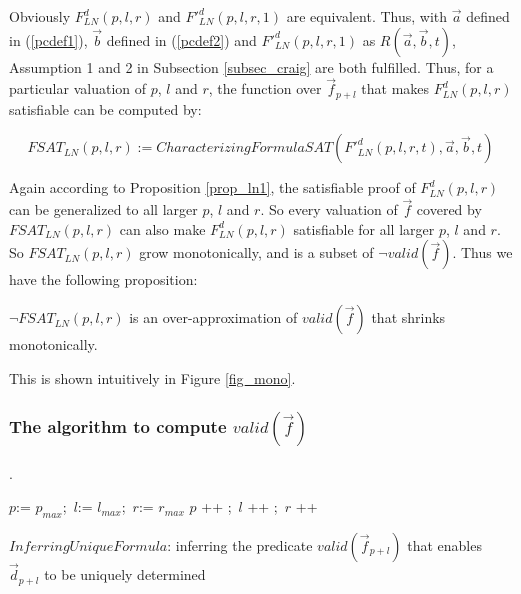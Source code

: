 \documentclass[runningheads,a4paper,orivec]{llncs}
\begin{document}
Obviously $F^d_{LN}(p,l,r)$ and $F'^d_{LN}(p,l,r,1)$ are equivalent.
Thus,
with $\vec{a}$ defined in (\ref{pcdef1}),
$\vec{b}$ defined in (\ref{pcdef2})
and $F'^d_{LN}(p,l,r,1)$ as $R(\vec{a},\vec{b},t)$,
Assumption 1 and 2 in Subsection \ref{subsec_craig} are both fulfilled.
Thus,
for a particular valuation of $p$, $l$ and $r$,
the function over $\vec{f}_{p+l}$ that makes $F^d_{LN}(p,l,r)$ satisfiable can be 
computed by:

\begin{equation}\label{fsat_ln}
FSAT_{LN}(p,l,r):=CharacterizingFormulaSAT(F'^d_{LN}(p,l,r,t),\vec{a},\vec{b},t)
\end{equation}

Again according to Proposition \ref{prop_ln1},
the satisfiable proof of $F^d_{LN}(p,l,r)$ can be generalized to all larger $p$, $l$ and $r$.
So every valuation of $\vec{f}$ covered by $FSAT_{LN}(p,l,r)$ can also make $F^d_{LN}(p,l,r)$ satisfiable for all larger $p$, $l$ and $r$.
So $FSAT_{LN}(p,l,r)$ grow monotonically,
and is a subset of $\neg valid(\vec{f})$.
Thus we have the following proposition:

\begin{proposition}\label{prop_ln}
$\neg FSAT_{LN}(p,l,r)$ is an over-approximation of $valid(\vec{f})$ that shrinks monotonically.
\end{proposition}

This is shown intuitively in Figure \ref{fig_mono}.



\subsubsection{\textbf{The algorithm to compute $valid(\vec{f})$}}\label{subsub_overal}.

\begin{algorithm}[b]
\SetAlgoVlined
$p$:= $p_{max}$;~$l$:= $l_{max}$;~$r$:= $r_{max}$ \;
 {
  $p$ ++ ;~$l$ ++ ;~$r$ ++ \;
}
\caption{$InferringUniqueFormula$: inferring the predicate $valid(\vec{f}_{p+l})$ 
that enables $\vec{d}_{p+l}$ to be uniquely determined}
\label{algo_infer}
\end{algorithm}
\end{document}
